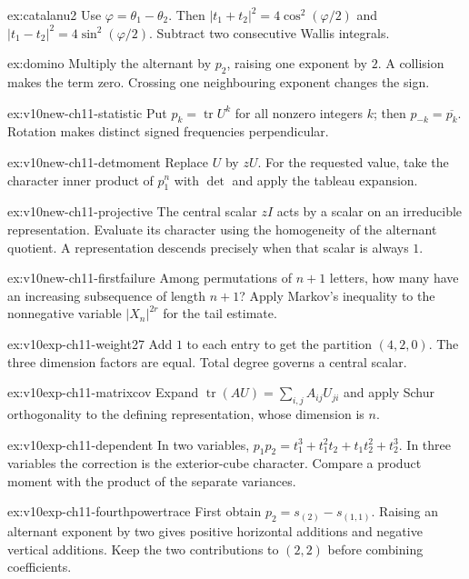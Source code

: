 \begin{hint}{ex:catalanu2}
Use $\varphi=\theta_1-\theta_2$. Then $|t_1+t_2|^2=4\cos^2(\varphi/2)$ and $|t_1-t_2|^2=4\sin^2(\varphi/2)$. Subtract two consecutive Wallis integrals.
\end{hint}

\begin{hint}{ex:domino}
Multiply the alternant by $p_2$, raising one exponent by $2$. A collision makes the term zero. Crossing one neighbouring exponent changes the sign.
\end{hint}

\begin{hint}{ex:v10new-ch11-statistic}
Put $p_k=\operatorname{tr}U^k$ for all nonzero integers $k$; then $p_{-k}=\overline{p_k}$. Rotation makes distinct signed frequencies perpendicular.
\end{hint}

\begin{hint}{ex:v10new-ch11-detmoment}
Replace $U$ by $zU$. For the requested value, take the character inner product of $p_1^n$ with $\det$ and apply the tableau expansion.
\end{hint}

\begin{hint}{ex:v10new-ch11-projective}
The central scalar $zI$ acts by a scalar on an irreducible representation. Evaluate its character using the homogeneity of the alternant quotient. A representation descends precisely when that scalar is always $1$.
\end{hint}

\begin{hint}{ex:v10new-ch11-firstfailure}
Among permutations of $n+1$ letters, how many have an increasing subsequence of length $n+1$? Apply Markov's inequality to the nonnegative variable $|X_n|^{2r}$ for the tail estimate.
\end{hint}

\begin{hint}{ex:v10exp-ch11-weight27}
Add $1$ to each entry to get the partition $(4,2,0)$. The three dimension factors are equal. Total degree governs a central scalar.
\end{hint}
\begin{hint}{ex:v10exp-ch11-matrixcov}
Expand $\operatorname{tr}(AU)=\sum_{i,j}A_{ij}U_{ji}$ and apply Schur orthogonality to the defining representation, whose dimension is $n$.
\end{hint}
\begin{hint}{ex:v10exp-ch11-dependent}
In two variables, $p_1p_2=t_1^3+t_1^2t_2+t_1t_2^2+t_2^3$. In three variables the correction is the exterior-cube character. Compare a product moment with the product of the separate variances.
\end{hint}
\begin{hint}{ex:v10exp-ch11-fourthpowertrace}
First obtain $p_2=s_{(2)}-s_{(1,1)}$. Raising an alternant exponent by two gives positive horizontal additions and negative vertical additions. Keep the two contributions to $(2,2)$ before combining coefficients.
\end{hint}

